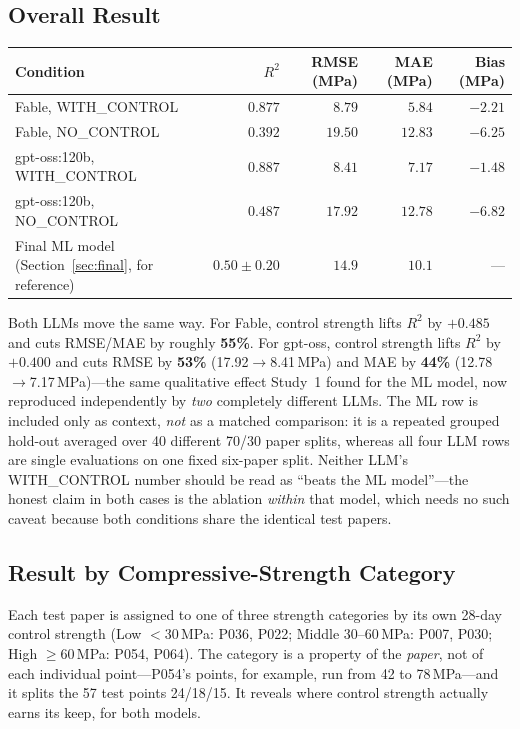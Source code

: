 \documentclass[11pt]{article}
\newcommand{\R}{$R^2$}
\begin{document}
\subsection{Overall Result}
\begin{center}\small
\begin{tabular}{lrrrr}
\toprule
Condition & \R{} & RMSE (MPa) & MAE (MPa) & Bias (MPa) \\
\midrule
\rowcolor{green!12}Fable, WITH\_CONTROL & $\mathbf{0.877}$ & $\mathbf{8.79}$ & $\mathbf{5.84}$ & $-2.21$ \\
Fable, NO\_CONTROL & $0.392$ & $19.50$ & $12.83$ & $-6.25$ \\
\rowcolor{green!12}gpt-oss:120b, WITH\_CONTROL & $\mathbf{0.887}$ & $\mathbf{8.41}$ & $7.17$ & $-1.48$ \\
gpt-oss:120b, NO\_CONTROL & $0.487$ & $17.92$ & $12.78$ & $-6.82$ \\
\midrule
Final ML model (Section~\ref{sec:final}, for reference) & $0.50\pm0.20$ & $14.9$ & $10.1$ & --- \\
\bottomrule
\end{tabular}
\end{center}

\noindent Both LLMs move the same way. For Fable, control strength lifts \R{} by
$+0.485$ and cuts RMSE/MAE by roughly \textbf{55\%}. For gpt-oss, control strength
lifts \R{} by $+0.400$ and cuts RMSE by \textbf{53\%} (17.92$\to$8.41\,MPa) and MAE by
\textbf{44\%} (12.78$\to$7.17\,MPa)---the same qualitative effect Study~1 found for the
ML model, now reproduced independently by \emph{two} completely different LLMs. The ML
row is included only as context, \emph{not} as a matched comparison: it is a repeated
grouped hold-out averaged over 40 different 70/30 paper splits, whereas all four LLM
rows are single evaluations on one fixed six-paper split. Neither LLM's WITH\_CONTROL
number should be read as ``beats the ML model''---the honest claim in both cases is the
ablation \emph{within} that model, which needs no such caveat because both conditions
share the identical test papers.

\subsection{Result by Compressive-Strength Category}
\label{sec:part2-opus-bins}
Each test paper is assigned to one of three strength categories by its own 28-day
control strength (Low $<30$\,MPa: P036, P022; Middle $30$--$60$\,MPa: P007, P030; High
$\geq60$\,MPa: P054, P064). The category is a property of the \emph{paper}, not of each
individual point---P054's points, for example, run from 42 to 78\,MPa---and it splits
the 57 test points 24/18/15. It reveals where control strength actually earns its
keep, for both models.
\end{document}
